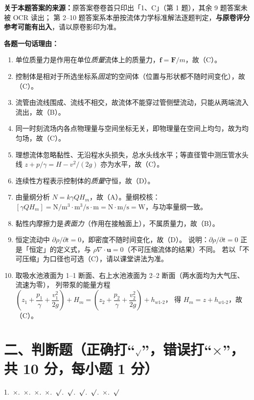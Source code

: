 \begin{tishi}
\textbf{关于本题答案的来源：}原答案卷卷首只印出「1、C」（第 1 题），其余 9 题答案未被 OCR 读出；
第 2--10 题答案系本册按流体力学标准解法逐题判定，\textbf{与原卷评分参考可能有出入}，请以原卷影印为准。

\textbf{各题一句话理由：}
\begin{enumerate}
  \item 单位质量力是作用在单位\emph{质量}流体上的质量力，$\bm f=\bm F/m$，故（C）。
  \item 控制体是相对于所选坐标系\emph{固定}的空间体（位置与形状都不随时间变化），故（C）。
  \item 流管由流线围成、流线不相交，故流体不能穿过管侧壁流动，只能从两端流入流出，故（B）。
  \item 同一时刻流场内各点物理量与空间坐标无关，即物理量在空间上均匀，故为均匀场，故（C）。
  \item 理想流体忽略黏性、无沿程水头损失，总水头线水平；等直径管中测压管水头线
        $z+p/\gamma=H-v^{2}/(2g)$ 亦为水平，故（C）。
  \item 连续性方程表示控制体的\emph{质量}守恒，故（D）。
  \item 由量纲分析 $N=k\gamma QH_m$，故（A）。量纲校核：
        $[\gamma QH_m]=\mathrm{N/m^{3}}\cdot\mathrm{m^{3}/s}\cdot\mathrm{m}=\mathrm{N\cdot m/s}=\mathrm{W}$，与功率量纲一致。
  \item 黏性内摩擦力是\emph{表面力}（作用在接触面上），不属质量力，故（B）。
  \item 恒定流动中 $\partial\rho/\partial t=0$，即密度不随时间变化，故（D）。
        说明：$\partial\rho/\partial t=0$ 正是「恒定」的定义式，与 $\rho\nabla\cdot\bm u=0$（不可压缩流体的结果）不同。
        若以「不可压缩」为口径也可选（C），请以课堂讲法为准。
  \item 取吸水池液面为 1--1 断面、右上水池液面为 2--2 断面（两水面均为大气压、流速为零），
        列带泵的能量方程
        $\left(z_1+\dfrac{p_1}{\gamma}+\dfrac{v_1^{2}}{2g}\right)+H_m
        =\left(z_2+\dfrac{p_2}{\gamma}+\dfrac{v_2^{2}}{2g}\right)+h_{w1\text{-}2}$，
        得 $H_m=z+h_{w1\text{-}2}$，故（C）。
\end{enumerate}
\end{tishi}

\section{二、判断题（正确打“$\surd$”，错误打“$\times$”，共 10 分，每小题 1 分）}

\begin{center}
1.~$\times$.~$\times$.~$\times$.~$\times$.~$\surd$.~$\surd$.~$\surd$.~$\surd$.~$\times$.~$\surd$
\end{center}

